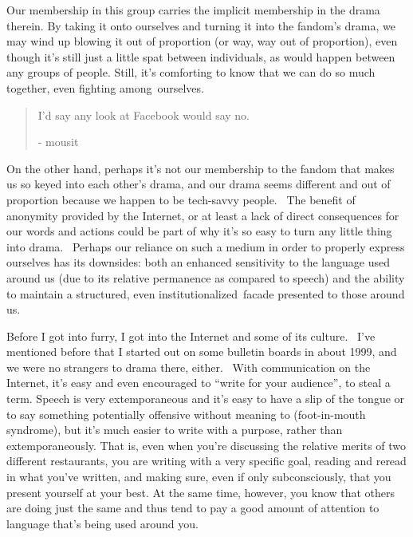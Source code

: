 Our membership in this group carries the implicit membership in the
drama therein. By taking it onto ourselves and turning it into the
fandom's drama, we may wind up blowing it out of proportion (or way, way
out of proportion), even though it's still just a little spat between
individuals, as would happen between any groups of people. Still, it's
comforting to know that we can do so much together, even fighting
among~ourselves.

\begin{quote}
I'd say any look at Facebook would say no.

- mousit
\end{quote}

On the other hand, perhaps it's not our membership to the fandom that
makes us so keyed into each other's drama, and our drama seems different
and out of proportion because we happen to be tech-savvy people. ~The
benefit of anonymity provided by the Internet, or at least a lack of
direct consequences for our words and actions could be part of why it's
so easy to turn any little thing into drama. ~Perhaps our reliance on
such a medium in order to properly express ourselves has its downsides:
both an enhanced sensitivity to the language used around us (due to its
relative permanence as compared to speech) and the ability to maintain a
structured, even institutionalized~facade presented to those around us.

Before I got into furry, I got into the Internet and some of its
culture. ~I've mentioned before that I started out on some bulletin
boards in about 1999, and we were no strangers to drama there, either.
~With communication on the Internet, it's easy and even encouraged to
``write for your audience'', to steal a term. Speech is very
extemporaneous and it's easy to have a slip of the tongue or to say
something potentially offensive without meaning to (foot-in-mouth
syndrome), but it's much easier to write with a purpose, rather than
extemporaneously. That is, even when you're discussing the relative
merits of two different restaurants, you are writing with a very
specific goal, reading and reread in what you've written, and making
sure, even if only subconsciously, that you present yourself at your
best. At the same time, however, you know that others are doing just the
same and thus tend to pay a good amount of attention to language that's
being used around you.

